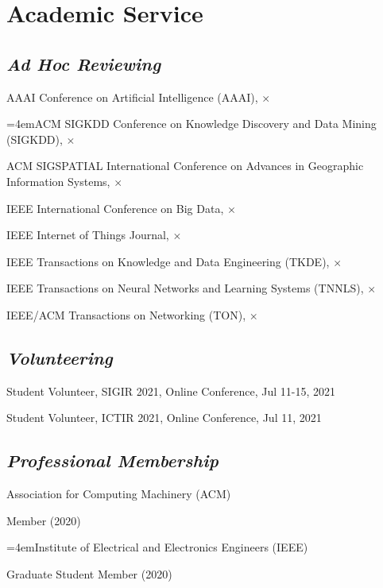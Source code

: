 
\vspace{-8pt}
\section*{Academic Service}
\vspace{-4pt}


\subsection*{\textnormal{\textit{Ad Hoc Reviewing}}}
\vspace{-4pt}
\indent

AAAI Conference on Artificial Intelligence (AAAI), $\times$

\hangindent=4emACM SIGKDD Conference on Knowledge Discovery and Data Mining (SIGKDD), $\times$

ACM SIGSPATIAL International Conference on Advances in Geographic Information Systems, $\times$

IEEE International Conference on Big Data, $\times$

IEEE Internet of Things Journal, $\times$

IEEE Transactions on Knowledge and Data Engineering (TKDE), $\times$

IEEE Transactions on Neural Networks and Learning Systems (TNNLS), $\times$

IEEE/ACM Transactions on Networking (TON), $\times$

\subsection*{\textnormal{\textit{Volunteering}}}
\vspace{-4pt}
\indent 

Student Volunteer, SIGIR 2021, Online Conference, Jul 11-15, 2021

Student Volunteer, ICTIR 2021, Online Conference, Jul 11, 2021


\subsection*{\textnormal{\textit{Professional Membership}}}
\vspace{-4pt}
\indent 

Association for Computing Machinery (ACM)  

\hspace{2em}Member (2020)

\hangindent=4emInstitute of Electrical and Electronics Engineers (IEEE)

\hspace{2em}Graduate Student Member (2020)